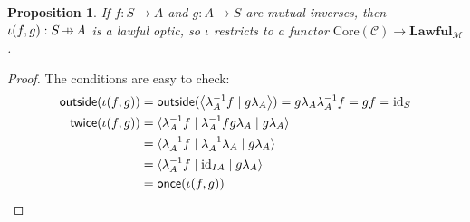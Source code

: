 \documentclass[11pt,letterpaper]{article}
\theoremstyle{plain}
\newtheorem{proposition}[theorem]{Proposition}
\theoremstyle{definition}
\newcommand{\C}{\mathscr{C}}
\newcommand{\M}{\mathscr{M}}
\newcommand{\Lawful}{\mathbf{Lawful}}
\newcommand{\id}{\mathrm{id}}
\newcommand{\rep}[2]{{\ensuremath \left\langle #1 \mid #2 \right\rangle}}
\newcommand{\repthree}[3]{{\ensuremath \langle #1 \mid #2 \mid #3 \rangle}}
\newcommand{\outside}{\mathsf{outside}}
\newcommand{\once}{\mathsf{once}}
\newcommand{\twice}{\mathsf{twice}}
\newcommand{\hto}{\ensuremath{\,\mathaccent\shortmid\rightarrow\,}}
\begin{document}
\begin{proposition}
  If $f : S \to A$ and $g : A \to S$ are mutual inverses, then $\iota(f, g) : S \hto A$ is a lawful optic, so $\iota$ restricts to a functor $\mathrm{Core}(\C) \to \Lawful_\M$.
\end{proposition}
\begin{proof}
The conditions are easy to check:
\begin{align*}
\outside(\iota(f, g)) &= \outside(\rep{\lambda_A^{-1} f}{g \lambda_{A}}) = g \lambda_{A} \lambda_A^{-1} f = g f = \id_S \\
\twice(\iota(f, g))
&= \repthree{\lambda_A^{-1} f}{\lambda_A^{-1} f g \lambda_{A}}{g \lambda_{A}} \\
&= \repthree{\lambda_A^{-1} f}{\lambda_A^{-1} \lambda_{A}}{g \lambda_{A}} \\
&= \repthree{\lambda_A^{-1} f}{\id_{IA}}{g \lambda_{A}} \\
&= \once(\iota(f, g))
\end{align*}
\end{proof}
\end{document}
